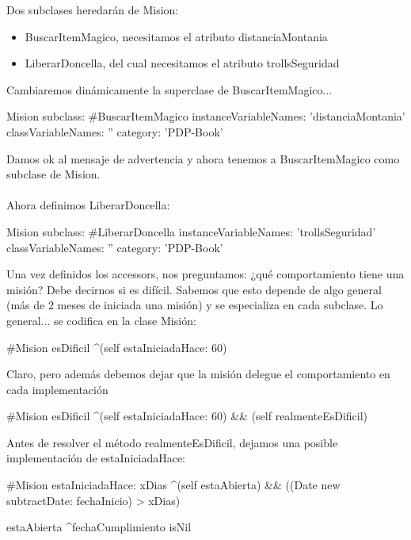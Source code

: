 \documentclass[a4paper,12pt]{book}
\begin{document}
Dos subclases heredarán de Mision: 

\begin{itemize}
 \item BuscarItemMagico, necesitamos el atributo distanciaMontania
 \item LiberarDoncella, del cual necesitamos el atributo trollsSeguridad
\end{itemize}

Cambiaremos dinámicamente la superclase de BuscarItemMagico...

\begin{code}
Mision subclass: #BuscarItemMagico
	instanceVariableNames: 'distanciaMontania'
	classVariableNames: ''
	category: 'PDP-Book'
\end{code}

Damos ok al mensaje de advertencia y ahora tenemos a BuscarItemMagico como subclase de Mision.
\\
\\
Ahora definimos LiberarDoncella:

\begin{code}
Mision subclass: #LiberarDoncella
	instanceVariableNames: 'trollsSeguridad'
	classVariableNames: ''
	category: 'PDP-Book'
\end{code}

Una vez definidos los accessors, nos preguntamos: ¿qué comportamiento tiene una misión? Debe decirnos
si es difícil. Sabemos que esto depende de algo general (más de 2 meses de iniciada una misión) y se
especializa en cada subclase. Lo general... se codifica en la clase Misión:

\begin{code}
#Mision
esDificil
	^(self estaIniciadaHace: 60)
\end{code}

Claro, pero además debemos dejar que la misión delegue el comportamiento en cada implementación
\begin{code}
#Mision
esDificil
	^(self estaIniciadaHace: 60) && (self realmenteEsDificil)
\end{code}

Antes de resolver el método realmenteEsDificil, dejamos una posible implementación de estaIniciadaHace:

\begin{code}
#Mision
estaIniciadaHace: xDias
      ^(self estaAbierta) && ((Date new subtractDate: fechaInicio) > xDias)
      
estaAbierta
      ^fechaCumplimiento isNil       
\end{code}
\end{document}
